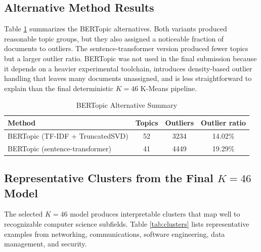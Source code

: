 \documentclass[conference]{IEEEtran}
\begin{document}
\subsection{Alternative Method Results}
Table \ref{tab:bertopic} summarizes the BERTopic alternatives. Both variants produced reasonable topic groups, but they also assigned a noticeable fraction of documents to outliers. The sentence-transformer version produced fewer topics but a larger outlier ratio. BERTopic was not used in the final submission because it depends on a heavier experimental toolchain, introduces density-based outlier handling that leaves many documents unassigned, and is less straightforward to explain than the final deterministic $K=46$ K-Means pipeline.

\begin{table}[H]
\caption{BERTopic Alternative Summary}
\label{tab:bertopic}
\centering
\footnotesize
\begin{tabular}{>{\raggedright\arraybackslash}p{}ccc}
\toprule
Method & Topics & Outliers & Outlier ratio \\
\midrule
BERTopic (TF-IDF + TruncatedSVD) & 52 & 3234 & 14.02\% \\
BERTopic (sentence-transformer) & 41 & 4449 & 19.29\% \\
\bottomrule
\end{tabular}
\end{table}

\subsection{Representative Clusters from the Final $K=46$ Model}
The selected $K=46$ model produces interpretable clusters that map well to recognizable computer science subfields. Table \ref{tab:clusters} lists representative examples from networking, communications, software engineering, data management, and security.
\end{document}
